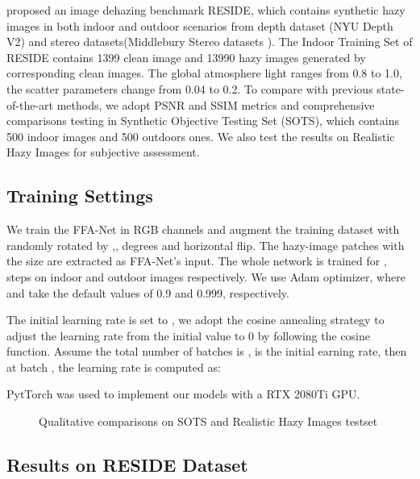 \documentclass[letterpaper]{article} \usepackage{aaai20}  \usepackage{times}  \usepackage{helvet} \usepackage{courier}  \usepackage[hyphens]{url}  \usepackage{graphicx} \urlstyle{rm} \def\UrlFont{\rm}  \usepackage{graphicx}  \frenchspacing  \setlength{\pdfpagewidth}{8.5in}  \setlength{\pdfpageheight}{11in}  \usepackage{bm}
\begin{document}
\cite{RESIDEbenchmarking}  proposed an image dehazing benchmark RESIDE, which contains synthetic hazy images  in both indoor and outdoor scenarios from depth dataset (NYU Depth V2\cite{nyu}) and
 stereo datasets(Middlebury Stereo datasets \cite{stereo}). 
 The Indoor Training Set of RESIDE contains 1399 clean image and 13990 hazy images generated by corresponding clean images. The global atmosphere light ranges from 0.8 to 1.0, the scatter parameters change from 0.04 to 0.2. To compare with previous state-of-the-art methods, we adopt PSNR and SSIM metrics and comprehensive comparisons testing in Synthetic Objective Testing Set (SOTS), which contains 500 indoor images and 500 outdoors ones. We also test the results on Realistic Hazy Images for subjective assessment.

\subsection{Training Settings}
We train the FFA-Net in RGB channels and augment the training dataset with randomly rotated by ,, degrees and horizontal flip.
The   hazy-image patches with the size  are extracted as FFA-Net’s input. The whole network is trained for ,  steps on indoor and outdoor images respectively. We use Adam optimizer, where  and  take the default values of 0.9 and 0.999, respectively. 

The initial learning rate is set to , 
we adopt the cosine annealing strategy \cite{cos} to adjust the learning rate from the initial value to 0 
by following the cosine function. Assume the total number of batches is , is the initial
earning rate,  then at batch , the learning rate  is computed as:


  PytTorch \cite{pytorch}  was used to implement our models with a RTX 2080Ti GPU.
\begin{figure*}[!]
	\centering

	\caption{Qualitative comparisons on SOTS and Realistic Hazy Images testset}

	
\label{fig8}
	
\end{figure*}

\subsection{Results on RESIDE Dataset}
\end{document}
